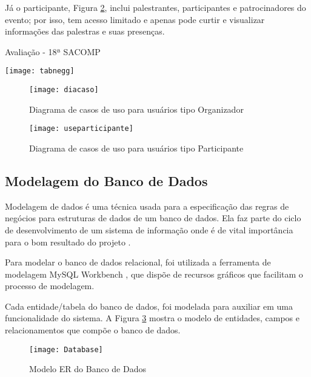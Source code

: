 \documentclass[tcc,capa]{texufpel}
\begin{document}
            Já o participante, Figura \ref{casopart}, inclui palestrantes, participantes e patrocinadores do evento; por isso, tem acesso limitado e apenas pode curtir e visualizar informações das palestras e suas presenças.
            
            
            \begin{table}[htbp]
                \caption{Avaliação - 18ª SACOMP}
                \centering \texttt{[image: tabnegg]}
                
                \label{feedsac}
            \end{table}
            
            \begin{figure}[H]
                \centering \texttt{[image: diacaso]}
                \caption{Diagrama de casos de uso para usuários tipo Organizador}
                \label{casousoorg}
            \end{figure}
            
            \begin{figure}[H]
                \centering \texttt{[image: useparticipante]}
                \caption{Diagrama de casos de uso para usuários tipo Participante}
                \label{casopart}
            \end{figure}
        
        
        \subsection{Modelagem do Banco de Dados}
        
            Modelagem de dados é uma técnica usada para a especificação das regras de negócios para estruturas de dados de um banco de dados. Ela faz parte do ciclo de desenvolvimento de um sistema de informação onde é de vital importância para o bom resultado do projeto \cite{heuser2001projeto}.
            
             Para modelar o banco de dados relacional, foi utilizada a ferramenta de modelagem MySQL Workbench \cite{Mysql:2015:Online}, que dispõe de recursos gráficos que facilitam o processo de modelagem.
             
             Cada entidade/tabela do banco de dados, foi modelada para auxiliar em uma funcionalidade do sistema. A Figura \ref{modelag} mostra o modelo de entidades, campos e relacionamentos que compõe o banco de dados.
             
            \begin{figure}[H]
                \centering \texttt{[image: Database]}
                \caption{Modelo ER do Banco de Dados}
                \label{modelag}
            \end{figure}
        
\end{document}
